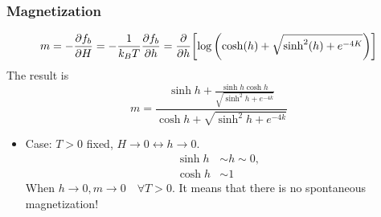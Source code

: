 \documentclass[../main/main.tex]{subfiles}
\begin{document}
\subsubsection{Magnetization}
\begin{equation}
  m = - \pdv{f_b}{H} = - \frac{1}{k_B T } \pdv{f_b}{h} = \pdv{}{h} \qty[  \log{\qty( \cosh(h)+\sqrt{\sinh^2(h)+e^{-4K}  } )} ]
\end{equation}
The result is
\begin{equation}
  m =   \frac{\sinh h + \frac{ \sinh h \cosh h}{\sqrt{\sinh^2 h + e^{-4k} }} }{\cosh h + \sqrt{\sinh^2 h + e^{-4k} } }
  \label{eq:8_1}
\end{equation}
\begin{itemize}
\item Case: \( T>0 \) fixed, \( H \rightarrow 0 \leftrightarrow h \rightarrow 0\).
\begin{subequations}
\begin{align}
  \sinh h & \sim h \sim 0, \\ \cosh h &\sim 1
\end{align}
\end{subequations}
When \( h \rightarrow 0, m \rightarrow 0 \quad \forall T>0 \). It means that there is no spontaneous magnetization!
\end{itemize}
\end{document}
